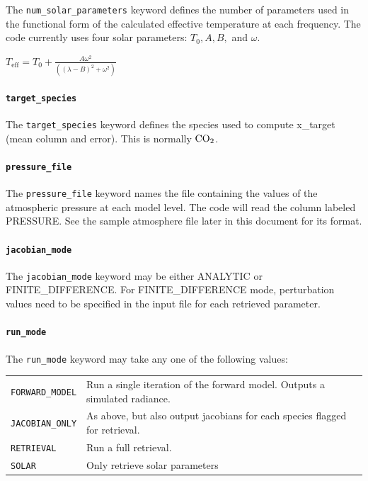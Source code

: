 \documentclass{article}
\newcommand{\COtwo}{\ensuremath{\rm{CO}_2}}
\begin{document}
The \texttt{num\_solar\_parameters} keyword defines the number of
parameters used in the functional form of the calculated effective
temperature at each frequency.  The code currently uses four solar
parameters: $T_0, A, B,$ and $\omega.$

\begin{math}
T_{\textrm{eff}} = T_0 + \frac{A\omega^2}{((\lambda - B)^2 + \omega^2)}
\end{math}

\paragraph{\texttt{target\_species}}

The \texttt{target\_species} keyword defines the species used to
compute x\_target (mean column and error).  This is normally \COtwo.

\paragraph{\texttt{pressure\_file}}

The \texttt{pressure\_file} keyword names the file containing the
values of the atmospheric pressure at each model level.  The code will
read the column labeled PRESSURE.  See the sample atmosphere file
later in this document for its format.

\paragraph{\texttt{jacobian\_mode}}

The \texttt{jacobian\_mode} keyword may be either ANALYTIC or
FINITE\_DIFFERENCE.  For FINITE\_DIFFERENCE mode, perturbation values
need to be specified in the input file for each retrieved parameter.

\paragraph{\texttt{run\_mode}}

The \texttt{run\_mode} keyword may take any one of the following values:

\begin{tabular}{|l|l|}
\hline
\texttt{FORWARD\_MODEL}  &Run a single iteration of the forward model.
 Outputs a simulated radiance.\\
\texttt{JACOBIAN\_ONLY} &As above, but also output jacobians for each
species flagged for retrieval.\\
\texttt{RETRIEVAL}&Run a full retrieval.             \\
\texttt{SOLAR}  &Only retrieve solar parameters    \\
\hline
\end{tabular}
\end{document}
